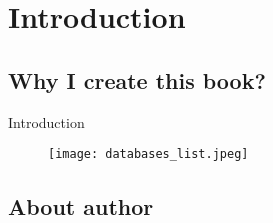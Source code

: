 \chapter{Introduction}

\section{Why I create this book?}

Introduction

\begin{figure}[hb]
  \centering
  \texttt{[image: databases\_list.jpeg]}
\end{figure}

\section{About author}